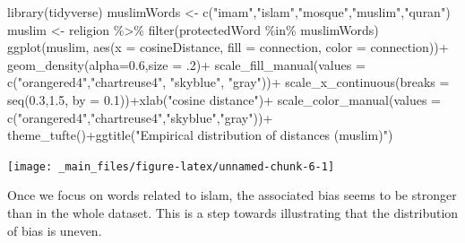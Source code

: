 \documentclass[
  12pt,
]{book}
\newenvironment{Shaded}{\begin{snugshade}}{\end{snugshade}}
\newcommand{\AttributeTok}[1]{\textcolor[rgb]{0.77,0.63,0.00}{#1}}
\newcommand{\DecValTok}[1]{\textcolor[rgb]{0.00,0.00,0.81}{#1}}
\newcommand{\FloatTok}[1]{\textcolor[rgb]{0.00,0.00,0.81}{#1}}
\newcommand{\FunctionTok}[1]{\textcolor[rgb]{0.00,0.00,0.00}{#1}}
\newcommand{\NormalTok}[1]{#1}
\newcommand{\OtherTok}[1]{\textcolor[rgb]{0.56,0.35,0.01}{#1}}
\newcommand{\SpecialCharTok}[1]{\textcolor[rgb]{0.00,0.00,0.00}{#1}}
\newcommand{\StringTok}[1]{\textcolor[rgb]{0.31,0.60,0.02}{#1}}
\begin{document}
\begin{Shaded}
\begin{Highlighting}[]
\FunctionTok{library}\NormalTok{(tidyverse)}
\NormalTok{muslimWords }\OtherTok{\textless{}{-}} \FunctionTok{c}\NormalTok{(}\StringTok{"imam"}\NormalTok{,}\StringTok{"islam"}\NormalTok{,}\StringTok{"mosque"}\NormalTok{,}\StringTok{"muslim"}\NormalTok{,}\StringTok{"quran"}\NormalTok{)}
\NormalTok{muslim }\OtherTok{\textless{}{-}}\NormalTok{ religion }\SpecialCharTok{\%\textgreater{}\%} \FunctionTok{filter}\NormalTok{(protectedWord }\SpecialCharTok{\%in\%}\NormalTok{ muslimWords)}
\FunctionTok{ggplot}\NormalTok{(muslim, }\FunctionTok{aes}\NormalTok{(}\AttributeTok{x =}\NormalTok{  cosineDistance, }\AttributeTok{fill =}\NormalTok{ connection, }\AttributeTok{color =}\NormalTok{ connection))}\SpecialCharTok{+}
  \FunctionTok{geom\_density}\NormalTok{(}\AttributeTok{alpha=}\FloatTok{0.6}\NormalTok{,}\AttributeTok{size =}\NormalTok{ .}\DecValTok{2}\NormalTok{)}\SpecialCharTok{+} 
  \FunctionTok{scale\_fill\_manual}\NormalTok{(}\AttributeTok{values =} \FunctionTok{c}\NormalTok{(}\StringTok{"orangered4"}\NormalTok{,}\StringTok{"chartreuse4"}\NormalTok{, }\StringTok{"skyblue"}\NormalTok{, }\StringTok{"gray"}\NormalTok{))}\SpecialCharTok{+}
  \FunctionTok{scale\_x\_continuous}\NormalTok{(}\AttributeTok{breaks =} \FunctionTok{seq}\NormalTok{(}\FloatTok{0.3}\NormalTok{,}\FloatTok{1.5}\NormalTok{, }\AttributeTok{by =} \FloatTok{0.1}\NormalTok{))}\SpecialCharTok{+}\FunctionTok{xlab}\NormalTok{(}\StringTok{"cosine distance"}\NormalTok{)}\SpecialCharTok{+}
  \FunctionTok{scale\_color\_manual}\NormalTok{(}\AttributeTok{values =} \FunctionTok{c}\NormalTok{(}\StringTok{"orangered4"}\NormalTok{,}\StringTok{"chartreuse4"}\NormalTok{,}\StringTok{"skyblue"}\NormalTok{,}\StringTok{"gray"}\NormalTok{))}\SpecialCharTok{+}
  \FunctionTok{theme\_tufte}\NormalTok{()}\SpecialCharTok{+}\FunctionTok{ggtitle}\NormalTok{(}\StringTok{"Empirical distribution of distances (muslim)"}\NormalTok{)}
\end{Highlighting}
\end{Shaded}

\begin{center}\texttt{[image: \_main\_files/figure-latex/unnamed-chunk-6-1]} \end{center}
\normalsize

\noindent Once we focus on words related to islam, the associated bias seems to be stronger than in the whole dataset. This is a step towards illustrating that the distribution of bias is uneven.
\end{document}
